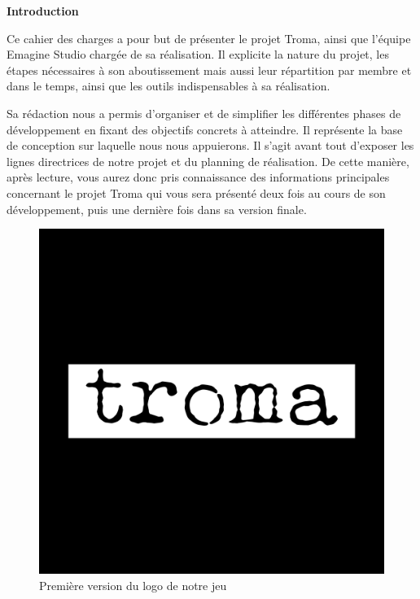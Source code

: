 \documentclass[a4paper, 11pt]{report}
\begin{document}
\tableofcontents

\newpage
\textbf{{\huge Introduction}} \vspace{7mm}

Ce cahier des charges a pour but de présenter le projet Troma, ainsi que l’équipe Emagine Studio chargée de sa réalisation.
Il explicite la nature du projet, les étapes nécessaires à son aboutissement mais aussi leur répartition par membre et dans le temps, ainsi que les outils indispensables à sa réalisation.

Sa rédaction nous a permis d’organiser et de simplifier les différentes phases de développement en fixant des objectifs concrets à atteindre. Il représente la base de conception sur laquelle nous nous appuierons.
Il s’agit avant tout d’exposer les lignes directrices de notre projet et du planning de réalisation. De cette manière, après lecture, vous aurez donc pris connaissance des informations principales concernant le projet Troma qui vous sera présenté deux fois au cours de son développement, puis une dernière fois dans sa version finale. \vspace{7mm}

\begin{figure}[htbp]
\centering
\includegraphics[scale=0.12]{troma.png}
\caption{Première version du logo de notre jeu}
\end{figure}
\end{document}
